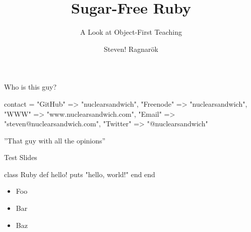 \documentclass[20pt,draft]{beamer}
\author{Steven! Ragnarök}
\title{Sugar-Free Ruby}
\subtitle{A Look at Object-First Teaching}
\date{}
\begin{document}
\begin{frame}
	\titlepage
\end{frame}

\begin{frame}[fragile]
	\begin{center}
		{
			Who is this guy?
		}
		\vspace{1cm}

		\insertauthor
	\end{center}
\begin{ruby10pt}
contact = {
  "GitHub"   =>        "nuclearsandwich",
  "Freenode" =>        "nuclearsandwich",
  "WWW"      =>    "www.nuclearsandwich.com",
  "Email"    => "steven@nuclearsandwich.com",
  "Twitter"  =>       "@nuclearsandwich"
}
\end{ruby10pt}
\begin{center}
	''That guy with all the opinions''
\end{center}
\end{frame}

\begin{section}{Test Slides}
\begin{frame}[fragile]
\begin{rubycode}
class Ruby
  def hello!
    puts "hello, world!"
  end
end
\end{rubycode}
\end{frame}

\begin{frame}
	\begin{itemize}
		\item Foo
		\item Bar
		\item Baz
	\end{itemize}
\end{frame}
\end{section}
\end{document}
